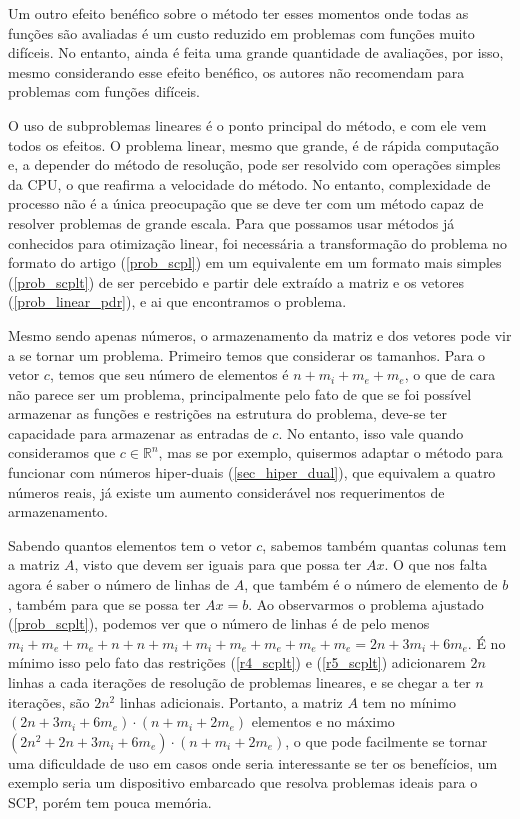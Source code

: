 Um outro efeito benéfico sobre o método ter esses momentos onde todas as funções são
avaliadas é um custo reduzido em problemas com funções muito difíceis. No entanto, ainda
é feita uma grande quantidade de avaliações, por isso, mesmo considerando esse efeito
benéfico, os autores não recomendam para problemas com funções difíceis.

O uso de subproblemas lineares é o ponto principal do método, e com ele vem todos
os efeitos. O problema linear, mesmo que grande, é de rápida computação e, a depender
do método de resolução, pode ser resolvido com operações simples da CPU, o que reafirma
a velocidade do método. No entanto, complexidade de processo não é a única preocupação
que se deve ter com um método capaz de resolver problemas de grande escala. Para que
possamos usar métodos já conhecidos para otimização linear, foi necessária a transformação
do problema no formato do artigo (\ref{prob_scpl}) em um equivalente em um formato mais
simples (\ref{prob_scplt}) de ser percebido e partir dele extraído a matriz
e os vetores (\ref{prob_linear_pdr}), e ai que encontramos o problema.

Mesmo sendo apenas números, o armazenamento da matriz e dos vetores pode vir a
se tornar um problema. Primeiro temos que considerar os tamanhos. Para o vetor
\(c\), temos que seu número de elementos é \(n+m_i+m_e+m_e\), o que de cara
não parece ser um problema, principalmente pelo fato de que se foi possível
armazenar as funções e restrições na estrutura do problema, deve-se ter
capacidade para armazenar as entradas de \(c\). No entanto, isso vale
quando consideramos que \(c \in \mathbb{R}^n\), mas se por exemplo, quisermos
adaptar o método para funcionar com números hiper-duais (\ref{sec_hiper_dual}),
que equivalem a quatro números reais, já existe um aumento considerável nos
requerimentos de armazenamento.

Sabendo quantos elementos tem o vetor \(c\), sabemos também quantas colunas tem
a matriz \(A\), visto que devem ser iguais para que possa ter \(Ax\). O que nos
falta agora é saber o número de linhas de \(A\), que também é o número de elemento
de \(b\), também para que se possa ter \(Ax = b\). Ao observarmos o problema
ajustado (\ref{prob_scplt}), podemos ver que o número de linhas é de pelo menos
\( m_i + m_e + m_e + n + n + m_i + m_i + m_e + m_e + m_e + m_e = 2n + 3m_i + 6m_e\).
É no mínimo isso pelo fato das restrições (\ref{r4_scplt}) e (\ref{r5_scplt})
adicionarem \(2n\) linhas a cada iterações de resolução de problemas lineares,
e se chegar a ter \(n\) iterações, são \(2n^2\) linhas adicionais.
Portanto, a matriz \(A\) tem no mínimo \( (2n + 3m_i+6m_e) \cdot  (n+m_i+2m_e) \)
elementos e no máximo  \( (2n^2 + 2n + 3m_i+6m_e) \cdot (n+m_i+2m_e)\), o que
pode facilmente se tornar uma dificuldade de uso em casos onde seria interessante
se ter os benefícios, um exemplo seria um dispositivo embarcado que resolva problemas
ideais para o SCP, porém tem pouca memória.


